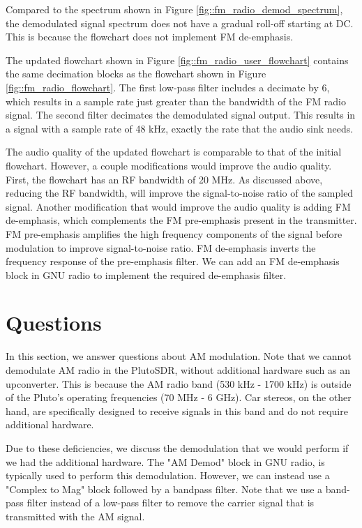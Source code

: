 \documentclass{article}
\begin{document}
\noindent Compared to the spectrum shown in Figure \ref{fig::fm_radio_demod_spectrum}, the demodulated signal spectrum does not have a gradual roll-off starting at DC. This is because the flowchart does not implement FM de-emphasis.

The updated flowchart shown in Figure \ref{fig::fm_radio_user_flowchart} contains the same decimation blocks as the flowchart shown in Figure \ref{fig::fm_radio_flowchart}. The first low-pass filter includes a decimate by 6, which results in a sample rate just greater than the bandwidth of the FM radio signal. The second filter decimates the demodulated signal output. This results in a signal with a sample rate of 48 kHz, exactly the rate that the audio sink needs.

The audio quality of the updated flowchart is comparable to that of the initial flowchart. However, a couple modifications would improve the audio quality. First, the flowchart has an RF bandwidth of 20 MHz. As discussed above, reducing the RF bandwidth, will improve the signal-to-noise ratio of the sampled signal. Another modification that would improve the audio quality is adding FM de-emphasis, which complements the FM pre-emphasis present in the transmitter. FM pre-emphasis amplifies the high frequency components of the signal before modulation to improve signal-to-noise ratio. FM de-emphasis inverts the frequency response of the pre-emphasis filter. We can add an FM de-emphasis block in GNU radio to implement the required de-emphasis filter.

\section{Questions}

In this section, we answer questions about AM modulation. Note that we cannot demodulate AM radio in the PlutoSDR, without additional hardware such as an upconverter. This is because the AM radio band (530 kHz - 1700 kHz) is outside of the Pluto's operating frequencies (70 MHz - 6 GHz). Car stereos, on the other hand, are specifically designed to receive signals in this band and do not require additional hardware.

Due to these deficiencies, we discuss the demodulation that we would perform if we had the additional hardware. The "AM Demod" block in GNU radio, is typically used to perform this demodulation. However, we can instead use a "Complex to Mag" block followed by a bandpass filter. Note that we use a band-pass filter instead of a low-pass filter to remove the carrier signal that is transmitted with the AM signal.
  
\end{document}
